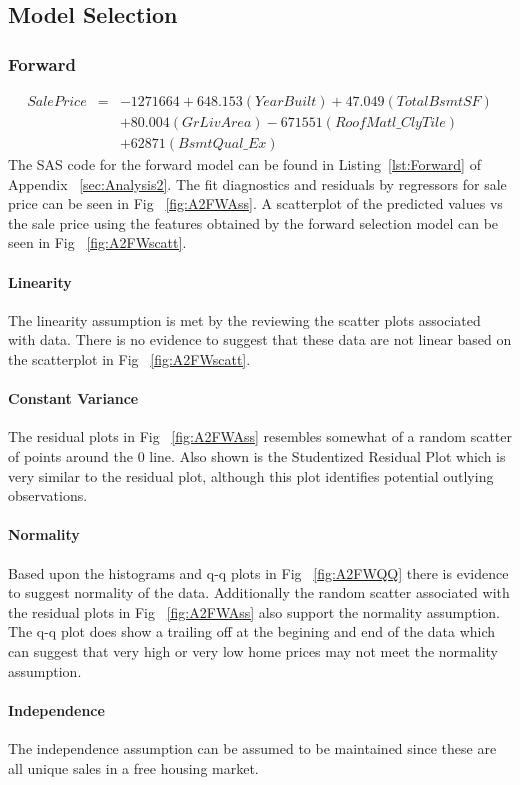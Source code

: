 \documentclass[11pt]{scrartcl} %
\begin{document}
\subsection{Model Selection}
\subsubsection{Forward}
\begin{eqnarray*}
SalePrice &=& -1271664 + 648.153(YearBuilt) + 47.049(TotalBsmtSF) \\
& & + 80.004(GrLivArea) - 671551(RoofMatl\_ClyTile)\\
& & + 62871(BsmtQual\_Ex)
\end{eqnarray*}
The SAS code for the forward model can be found in Listing~\ref{lst:Forward} of Appendix ~\ref{sec:Analysis2}.
The fit diagnostics and residuals by regressors for sale price can be seen in Fig ~\ref{fig:A2FWAss}. A scatterplot of the predicted values vs the sale price using the features obtained by the forward selection model can be seen in Fig ~\ref{fig:A2FWscatt}.
\paragraph{Linearity} The linearity assumption is met by the reviewing the scatter plots associated with data. There is no evidence to suggest that these data are not linear based on the scatterplot in Fig ~\ref{fig:A2FWscatt}.
\paragraph{Constant Variance} The residual plots in Fig ~\ref{fig:A2FWAss} resembles somewhat of a random scatter of points around the 0 line. Also shown is the Studentized Residual Plot which is very similar to the residual plot, although this plot identifies potential outlying observations.
\paragraph{Normality} Based upon the histograms and q-q plots in Fig ~\ref{fig:A2FWQQ} there is evidence to suggest normality of the data. Additionally the random scatter associated with the residual plots in Fig ~\ref{fig:A2FWAss} also support the normality assumption. The q-q plot does show a trailing off at the begining and end of the data which can suggest that very high or very low home prices may not meet the normality assumption.
\paragraph{Independence} The independence assumption can be assumed to be maintained since these are all unique sales in a free housing market. 
\end{document}
